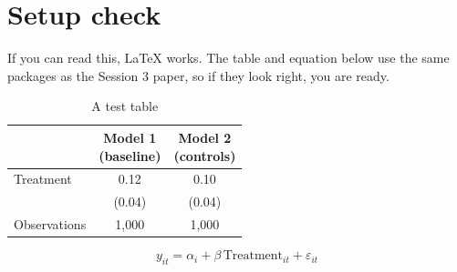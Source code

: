 \documentclass[11pt]{article}
\begin{document}
\section*{Setup check}

If you can read this, \LaTeX{} works. The table and equation below use the same
packages as the Session 3 paper, so if they look right, you are ready.

\begin{table}[H]
  \centering
  \caption{A test table}
  \begin{tabular}{lcc}
    \toprule
    & \makecell{Model 1\\(baseline)} & \makecell{Model 2\\(controls)} \\
    \midrule
    Treatment & 0.12 & 0.10 \\
              & (0.04) & (0.04) \\
    \midrule
    Observations & 1,000 & 1,000 \\
    \bottomrule
  \end{tabular}
\end{table}

\begin{equation}
  y_{it} = \alpha_i + \beta \, \text{Treatment}_{it} + \varepsilon_{it}
\end{equation}
\end{document}
